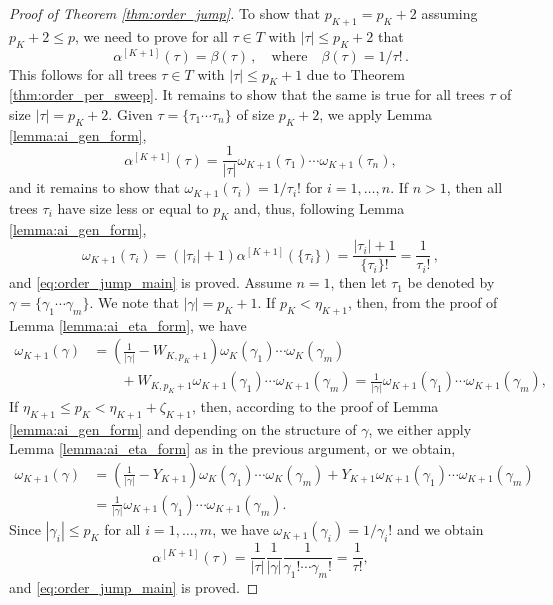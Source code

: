 \documentclass[10pt,a4paper]{amsart}
\newcommand{\reva}[1]{#1}%
\theoremstyle{plain}
\theoremstyle{definition}
\theoremstyle{remark}
\begin{document}
\begin{proof}[Proof of Theorem \ref{thm:order_jump}]
    To show that $p_{K+1} = p_K + 2$ assuming $p_K + 2 \leq p$, we need to prove for all $\tau \in T$ with $|\tau| \leq p_K + 2$ that
    \begin{equation}
        \label{eq:order_jump_main}
        \reva{\alpha^{[K+1]}(\tau) = \beta(\tau) \,, \quad \text{where} \quad \beta(\tau) = 1/\tau! \,.}
    \end{equation}
    This follows for all trees $\tau \in T$ with $|\tau| \leq p_K + 1$ due to Theorem \ref{thm:order_per_sweep}. It remains to show that the same is true for all trees $\tau$ of size $|\tau| = p_K + 2$. 
    \reva{Given $\tau = \reva{\{\tau_1 \cdots \tau_n\}}$ of size $p_K + 2$, we apply Lemma \ref{lemma:ai_gen_form},}
    \[ \alpha^{[K+1]}(\tau) = \frac{1}{|\tau|} \reva{\omega_{K+1}(\tau_1) \cdots \omega_{K+1}(\tau_n)}, \]
    and it remains to show that $\omega_{K+1} (\tau_i) = 1/\tau_i!$ for $i= 1, \dots, n$.
    If $n > 1$, then all trees $\tau_i$ have size less or equal to $p_K$ and, \reva{thus, following Lemma \ref{lemma:ai_gen_form},
    \[ \omega_{K+1}(\tau_i) = (|\tau_i| + 1) \alpha^{[K+1]} (\{\tau_i\}) = \frac{|\tau_i| + 1}{\{\tau_i\}!} = \frac1{\tau_i!} \,, \]
and \eqref{eq:order_jump_main} is proved}. Assume $n = 1$, then let $\tau_1$ be denoted by $\gamma = \reva{\{ \gamma_1\cdots \gamma_m\}}$. We note that $|\gamma| = p_K + 1$. If $p_K < \eta_{K+1}$, then, from the proof of Lemma \ref{lemma:ai_eta_form}, we have
    \begin{align*}
        \omega_{K+1} (\gamma) &= (\frac{1}{|\gamma|} - W_{K,p_K + 1}) \reva{\omega_K (\gamma_1) \cdots \omega_K (\gamma_m)} \\
        &\quad\quad + W_{K,p_K + 1} \reva{\omega_{K+1} (\gamma_1) \cdots \omega_{K+1} (\gamma_m)} = \frac{1}{|\gamma|} \reva{\omega_{K+1} (\gamma_1) \cdots \omega_{K+1} (\gamma_m)},
    \end{align*}
    If $\eta_{K+1} \leq p_K < \eta_{K+1} + \zeta_{K+1}$, then, according to the proof of Lemma \ref{lemma:ai_gen_form} and depending on the structure of $\gamma$, we either apply Lemma \ref{lemma:ai_eta_form} \reva{as in the previous argument, or we obtain,}
    \begin{align*}
        \omega_{K+1} (\gamma) &= (\frac{1}{|\gamma|} - Y_{K+1}) \reva{\omega_K (\gamma_1) \cdots \omega_K (\gamma_m)} + Y_{K+1} \reva{\omega_{K+1} (\gamma_1) \cdots \omega_{K+1} (\gamma_m)} \\
    &= \frac{1}{|\gamma|} \reva{\omega_{K + 1}(\gamma_1) \cdots \omega_{K + 1}(\gamma_m)} .
    \end{align*}
    Since \reva{$|\gamma_i| \leq p_K$ for all $i=1,\dots,m$, we have $\omega_{K+1} (\gamma_i) = 1/\gamma_i!$} and we obtain
    \[ \alpha^{[K+1]} (\tau) = \frac{1}{|\tau|} \frac{1}{|\gamma|} \frac{1}{\gamma_1! \cdots \gamma_m!} = \frac{1}{\tau!}, \]
    and \eqref{eq:order_jump_main} is proved.
\end{proof}
\end{document}

